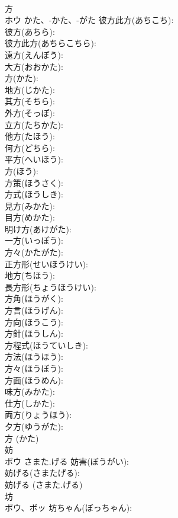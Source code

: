 \documentclass[8pt]{extreport}
\begin{document}
\begin{CJK}{UTF8}{min}
\\	方		
\\	ホウ	かた、-かた、-がた	彼方此方(あちこち): 
\\	彼方(あちら): 
\\	彼方此方(あちらこちら): 
\\	遠方(えんぽう): 
\\	大方(おおかた): 
\\	方(かた): 
\\	地方(じかた): 
\\	其方(そちら): 
\\	外方(そっぽ): 
\\	立方(たちかた): 
\\	他方(たほう): 
\\	何方(どちら): 
\\	平方(へいほう): 
\\	方(ほう): 
\\	方策(ほうさく): 
\\	方式(ほうしき): 
\\	見方(みかた): 
\\	目方(めかた): 
\\	明け方(あけがた): 
\\	一方(いっぽう): 
\\	方々(かたがた): 
\\	正方形(せいほうけい): 
\\	地方(ちほう): 
\\	長方形(ちょうほうけい): 
\\	方角(ほうがく): 
\\	方言(ほうげん): 
\\	方向(ほうこう): 
\\	方針(ほうしん): 
\\	方程式(ほうていしき): 
\\	方法(ほうほう): 
\\	方々(ほうぼう): 
\\	方面(ほうめん): 
\\	味方(みかた): 
\\	仕方(しかた): 
\\	両方(りょうほう): 
\\	夕方(ゆうがた): 
\\	方 (かた)
\\	妨			
\\	ボウ	さまた.げる	妨害(ぼうがい): 
\\	妨げる(さまたげる): 
\\	妨げる (さまた.げる)
\\	坊			
\\	ボウ、ボッ		坊ちゃん(ぼっちゃん): 

\end{CJK}
\end{document}
